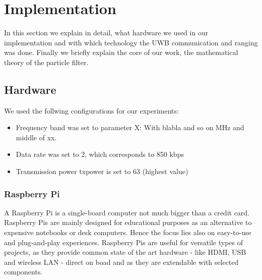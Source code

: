 
\chapter{Implementation} %

\label{Chapter4} %
In this section we explain in detail, what hardware we used in our implementation and with which technology the UWB communication and ranging was done. Finally we briefly explain the core of our work, the mathematical theory of the particle filter.


\section{Hardware}
We used the follwing configurations for our experiments:
\begin{itemize}
\item Frequency band was set to parameter X: With blabla and so on MHz and middle of xx. 
\item Data rate was set to 2, which corresponds to 850 kbps
\item Transmission power txpower is set to 63 (highest value)
\end{itemize}


\subsection{Raspberry Pi}
A Raspberry Pi is a single-board computer not much bigger than a credit card. Raspberry Pis are mainly designed for educational purposes as an alternative to expensive notebooks or desk computers. Hence the focus lies also on easy-to-use and plug-and-play experiences. Raspberry Pis are useful for versatile types of projects, as they provide common state of the art hardware - like HDMI, USB and wireless LAN - direct on boad and as they are extendable with selected components.



